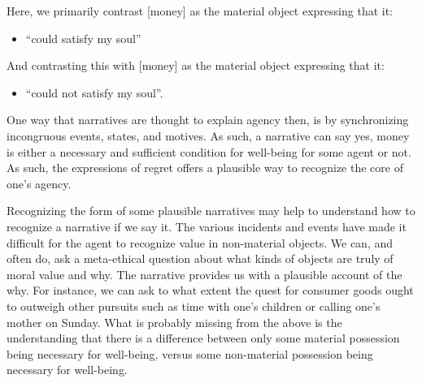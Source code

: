 \documentclass[
  letterpaper,
  DIV=11,
  numbers=noendperiod]{scrreprt}
\providecommand{\tightlist}{%
  \setlength{\itemsep}{0pt}\setlength{\parskip}{0pt}}\usepackage{longtable,booktabs,array}
\begin{document}
\begin{tcolorbox}[enhanced jigsaw, arc=.35mm, breakable, rightrule=.15mm, colback=white, colframe=quarto-callout-important-color-frame, bottomrule=.15mm, leftrule=.75mm, opacityback=0, toprule=.15mm, left=2mm]
\begin{tcolorbox}[enhanced jigsaw, arc=.35mm, breakable, rightrule=.15mm, colback=white, colframe=quarto-callout-tip-color-frame, bottomrule=.15mm, leftrule=.75mm, opacityback=0, toprule=.15mm, left=2mm]
Here, we primarily contrast {[}money{]} as the material object
expressing that it:

\begin{itemize}
\tightlist
\item
  ``could satisfy my soul''
\end{itemize}

And contrasting this with {[}money{]} as the material object expressing
that it:

\begin{itemize}
\tightlist
\item
  ``could not satisfy my soul''.
\end{itemize}

One way that narratives are thought to explain agency then, is by
synchronizing incongruous events, states, and motives. As such, a
narrative can say yes, money is either a necessary and sufficient
condition for well-being for some agent or not. As such, the expressions
of regret offers a plausible way to recognize the core of one's agency.

Recognizing the form of some plausible narratives may help to understand
how to recognize a narrative if we say it. The various incidents and
events have made it difficult for the agent to recognize value in
non-material objects. We can, and often do, ask a meta-ethical question
about what kinds of objects are truly of moral value and why. The
narrative provides us with a plausible account of the why. For instance,
we can ask to what extent the quest for consumer goods ought to outweigh
other pursuits such as time with one's children or calling one's mother
on Sunday. What is probably missing from the above is the understanding
that there is a difference between only some material possession being
necessary for well-being, versus some non-material possession being
necessary for well-being.


\end{tcolorbox}
\end{tcolorbox}
\end{document}
